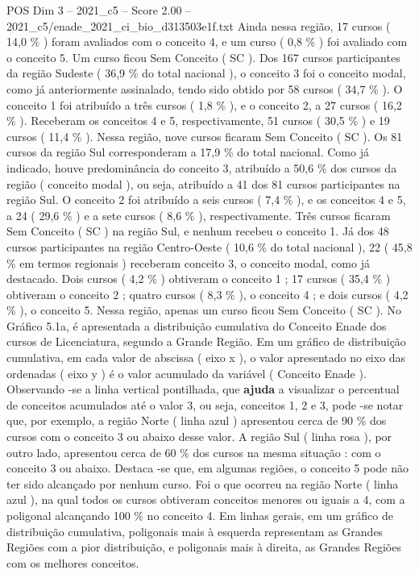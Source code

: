 \begin{textsample}{POS Dim 3 – 2021\_c5 – Score 2.00 – 2021\_c5/enade\_2021\_ci\_bio\_d313503e1f.txt}
Ainda nessa região, 17 cursos ( 14,0 \% ) foram avaliados com o conceito 4, e um curso ( 0,8 \% ) foi avaliado com o conceito 5.
Um curso ficou Sem Conceito ( SC ).
Dos 167 cursos participantes da região Sudeste ( 36,9 \% do total nacional ), o conceito 3 foi o conceito modal, como já anteriormente assinalado, tendo sido obtido por 58 cursos ( 34,7 \% ).
O conceito 1 foi atribuído a três cursos ( 1,8 \% ), e o conceito 2, a 27 cursos ( 16,2 \% ).
Receberam os conceitos 4 e 5, respectivamente, 51 cursos ( 30,5 \% ) e 19 cursos ( 11,4 \% ).
Nessa região, nove cursos ficaram Sem Conceito ( SC ).
Os 81 cursos da região Sul corresponderam a 17,9 \% do total nacional.
Como já indicado, houve predominância do conceito 3, atribuído a 50,6 \% dos cursos da região ( conceito modal ), ou seja, atribuído a 41 dos 81 cursos participantes na região Sul.
O conceito 2 foi atribuído a seis cursos ( 7,4 \% ), e os conceitos 4 e 5, a 24 ( 29,6 \% ) e a sete cursos ( 8,6 \% ), respectivamente.
Três cursos ficaram Sem Conceito ( SC ) na região Sul, e nenhum recebeu o conceito 1.
Já dos 48 cursos participantes na região Centro-Oeste ( 10,6 \% do total nacional ), 22 ( 45,8 \% em termos regionais ) receberam conceito 3, o conceito modal, como já destacado.
Dois cursos ( 4,2 \% ) obtiveram o conceito 1 ; 17 cursos ( 35,4 \% ) obtiveram o conceito 2 ; quatro cursos ( 8,3 \% ), o conceito 4 ; e dois cursos ( 4,2 \% ), o conceito 5.
Nessa região, apenas um curso ficou Sem Conceito ( SC ).
No Gráfico 5.1a, é apresentada a distribuição cumulativa do Conceito Enade dos cursos de Licenciatura, segundo a Grande Região.
Em um gráfico de distribuição cumulativa, em cada valor de abscissa ( eixo x ), o valor apresentado no eixo das ordenadas ( eixo y ) é o valor acumulado da variável ( Conceito Enade ).
Observando -se a linha vertical pontilhada, que \textbf{ajuda} a visualizar o percentual de conceitos acumulados até o valor 3, ou seja, conceitos 1, 2 e 3, pode -se notar que, por exemplo, a região Norte ( linha azul ) apresentou cerca de 90 \% dos cursos com o conceito 3 ou abaixo desse valor.
A região Sul ( linha rosa ), por outro lado, apresentou cerca de 60 \% dos cursos na mesma situação : com o conceito 3 ou abaixo.
Destaca -se que, em algumas regiões, o conceito 5 pode não ter sido alcançado por nenhum curso.
Foi o que ocorreu na região Norte ( linha azul ), na qual todos os cursos obtiveram conceitos menores ou iguais a 4, com a poligonal alcançando 100 \% no conceito 4.
Em linhas gerais, em um gráfico de distribuição cumulativa, poligonais mais à esquerda representam as Grandes Regiões com a pior distribuição, e poligonais mais à direita, as Grandes Regiões com os melhores conceitos.

\end{textsample}
